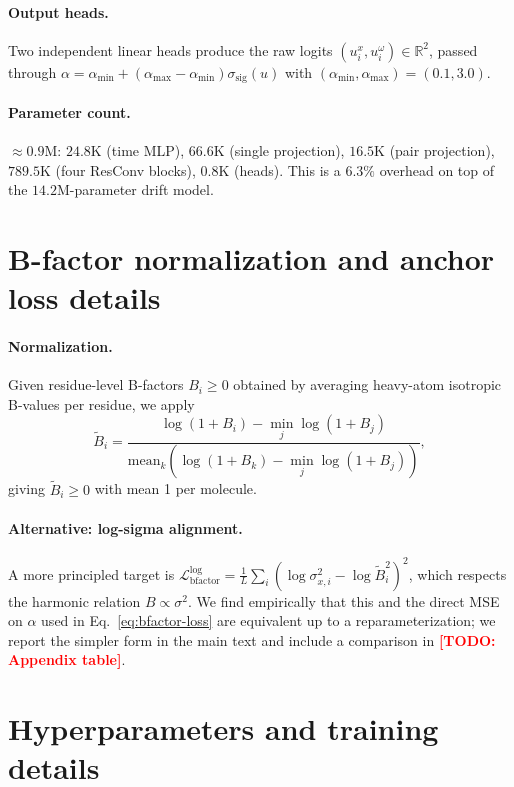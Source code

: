 \documentclass{article}
\theoremstyle{remark}
\theoremstyle{definition}
\newcommand{\R}{\mathbb{R}}
\newcommand{\sigmoid}{\sigma_{\mathrm{sig}}}
\newcommand{\todo}[1]{\textcolor{red}{\textbf{[TODO: #1]}}}
\begin{document}
\paragraph{Output heads.}
Two independent linear heads produce the raw logits
$(u^x_i,u^\omega_i)\in\R^2$, passed through
$\alpha=\alpha_{\min}+(\alpha_{\max}-\alpha_{\min})\sigmoid(u)$ with
$(\alpha_{\min},\alpha_{\max})=(0.1,3.0)$.

\paragraph{Parameter count.}
$\approx 0.9$M: $24.8$K (time MLP), $66.6$K (single projection), $16.5$K (pair
projection), $789.5$K (four ResConv blocks), $0.8$K (heads). This is a $6.3\%$
overhead on top of the $14.2$M-parameter drift model.

\section{B-factor normalization and anchor loss details}
\label{app:bfactor}

\paragraph{Normalization.}
Given residue-level B-factors $B_i\geq 0$ obtained by averaging heavy-atom
isotropic B-values per residue, we apply
\[
\tilde B_i
=\frac{\log(1+B_i)-\min_j\log(1+B_j)}
{\mathrm{mean}_k(\log(1+B_k)-\min_j\log(1+B_j))},
\]
giving $\tilde B_i\geq 0$ with mean 1 per molecule.

\paragraph{Alternative: log-sigma alignment.}
A more principled target is
$\mathcal{L}_{\text{bfactor}}^{\text{log}}=\tfrac{1}{L}\sum_i
(\log\sigma^2_{x,i}-\log\tilde B_i^2)^2$, which respects the harmonic relation
$B\propto\sigma^2$. We find empirically that this and the direct MSE on
$\alpha$ used in Eq.~\eqref{eq:bfactor-loss} are equivalent up to a
reparameterization; we report the simpler form in the main text and include
a comparison in \todo{Appendix table}.

\section{Hyperparameters and training details}
\label{app:train}
\end{document}
